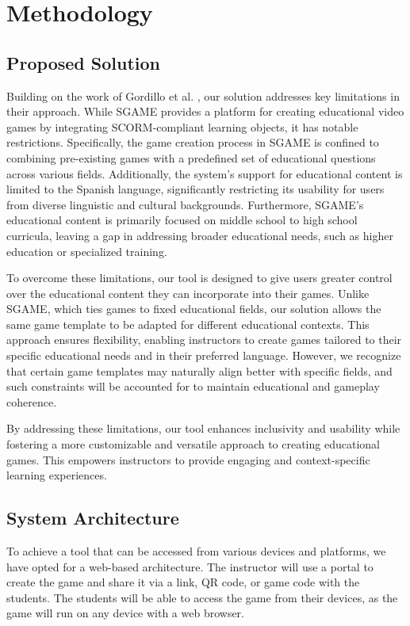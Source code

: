 \chapter{Methodology}\label{chap:method}

\section{Proposed Solution}

Building on the work of Gordillo et al. \cite{sgame2020}, our solution addresses key limitations in their approach. While SGAME provides a platform for creating educational video games by integrating SCORM-compliant learning objects, it has notable restrictions. Specifically, the game creation process in SGAME is confined to combining pre-existing games with a predefined set of educational questions across various fields. Additionally, the system’s support for educational content is limited to the Spanish language, significantly restricting its usability for users from diverse linguistic and cultural backgrounds. Furthermore, SGAME's educational content is primarily focused on middle school to high school curricula, leaving a gap in addressing broader educational needs, such as higher education or specialized training.

To overcome these limitations, our tool is designed to give users greater control over the educational content they can incorporate into their games. Unlike SGAME, which ties games to fixed educational fields, our solution allows the same game template to be adapted for different educational contexts. This approach ensures flexibility, enabling instructors to create games tailored to their specific educational needs and in their preferred language. However, we recognize that certain game templates may naturally align better with specific fields, and such constraints will be accounted for to maintain educational and gameplay coherence.

By addressing these limitations, our tool enhances inclusivity and usability while fostering a more customizable and versatile approach to creating educational games. This empowers instructors to provide engaging and context-specific learning experiences.

\section{System Architecture}

To achieve a tool that can be accessed from various devices and platforms, we have opted for a web-based architecture. The instructor will use a portal to create the game and share it via a link, QR code, or game code with the students. The students will be able to access the game from their devices, as the game will run on any device with a web browser.

